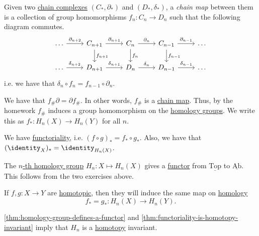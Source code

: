 \begin{definition}\label{def:chain-map}
	Given two \hyperref[def:chain-complex]{chain complexes} $(C_\ast, \partial_\ast)$ and $(D_\ast, \delta_\ast)$, a \emph{chain map} between them is a collection of
	group homomorphisms $f_n \colon C_n \to D_n$ such that the following diagram commutes.
	\[\begin{tikzcd}
			\ldots & {C_{n+1}} & {C_n} & {C_{n-1}} & \ldots \\
			\ldots & {D_{n+1}} & {D_n} & {D_{n-1}} & \ldots
			\arrow["{\partial_{n+2}}", from=1-1, to=1-2]
			\arrow["{\delta_{n+2}}", from=2-1, to=2-2]
			\arrow["{\delta_{n+1}}", from=2-2, to=2-3]
			\arrow["{\delta_{n}}", from=2-3, to=2-4]
			\arrow["{\partial_{n-1}}", from=1-4, to=1-5]
			\arrow["{\partial_{n}}", from=1-3, to=1-4]
			\arrow["{\partial_{n+1}}", from=1-2, to=1-3]
			\arrow["{\delta_{n-1}}", from=2-4, to=2-5]
			\arrow["{f_{n-1}}", from=1-4, to=2-4]
			\arrow["{f_{n}}", from=1-3, to=2-3]
			\arrow["{f_{n+1}}", from=1-2, to=2-2]
		\end{tikzcd}\]
	i.e. we have that $\delta_n \circ f_n = f_{n - 1} \circ \partial_n$.
\end{definition}

\begin{exercise}
	We have that $f_{\#} \partial = \partial f_{\#}$. In other words, $f_{\#}$ is a \hyperref[def:chain-map]{chain map}. Thus, by the homework $f_{\#}$ induces a group
	homomorphism on the \hyperref[def:homology-group]{homology groups}. We write this as $f_\ast \colon H_n(X) \to H_n(Y)$ for all $n$.
\end{exercise}

\begin{exercise}
	We have \underline{functoriality}, i.e. $(f \circ g)_\ast = f_\ast \circ g_\ast$. Also, we have that $(\identity_X)_\ast = \identity_{H_n(X)}$.
\end{exercise}

\begin{theorem}\label{thm:homology-group-defines-a-functor}
	The \hyperref[def:homology-group]{\(n\)-th homology group} $H_n \colon X \mapsto H_n(X)$ gives a \hyperref[def:functor]{functor} from $\underline{\mathrm{Top}}$
	to $\underline{\mathrm{Ab} }$. This follows from the two exercises above.
\end{theorem}

\begin{theorem}\label{thm:functoriality-is-homotopy-invariant}
	If $f, g\colon X \to Y$ are \hyperref[def:homotopic]{homotopic}, then they will induce the same map on \hyperref[def:homology-group]{homology}
	\[
		f_\ast = g_\ast : H_n(X) \to H_n(Y).
	\]
\end{theorem}

\begin{exercise}
	\autoref{thm:homology-group-defines-a-functor} and \autoref{thm:functoriality-is-homotopy-invariant} imply that \(H_{n} \) is a \hyperref[def:homotopy]{homotopy} invariant.
\end{exercise}